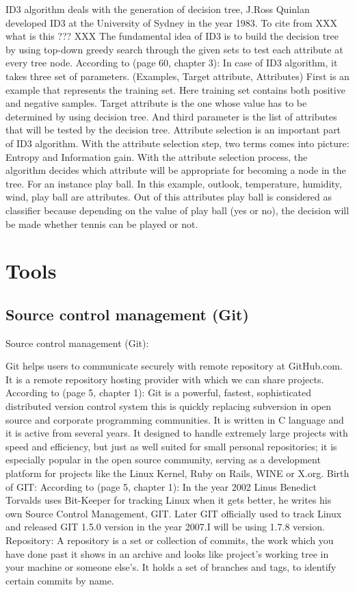 \documentclass{article}
\begin{document}
ID3 algorithm deals with the generation of decision tree, J.Ross Quinlan developed ID3 at the University of Sydney in the year 1983. To cite from \cite{OverviewOfDecisionTrees} XXX what is this ??? XXX
The fundamental idea of ID3 is to build the decision tree by using top-down greedy search through the given sets to test each attribute at every tree node.
According to \cite{Mitchell1997MachineLearning}(page 60, chapter 3): In case of ID3 algorithm, it takes three set of parameters.
(Examples, Target attribute, Attributes)
First is an example that represents the training set. Here training set contains both positive and negative samples. Target attribute is the one whose value has to be determined by using decision tree. And third parameter is the list of attributes that will be tested by the decision tree. Attribute selection is an important part of ID3 algorithm. With the attribute selection step, two terms comes into picture: Entropy and Information gain. With the attribute selection process, the algorithm decides which attribute will be appropriate for becoming a node in the tree.
For an instance play ball. In this example, outlook, temperature, humidity, wind, play ball are attributes. Out of this attributes play ball is considered as classifier because depending on the value of play ball (yes or no), the decision will be made whether tennis can be played or not.


\section{Tools}
\label{sec:Tools}

\subsection{Source control management (Git)}
\label{sec:scm}

Source control management (Git):

Git helps users to communicate securely with remote repository at GitHub.com. It is a remote repository hosting provider with which we can share projects.	
According to \cite{Chacon2011ProGit} (page 5, chapter 1): Git is a powerful, fastest, sophisticated distributed version control system this is quickly replacing subversion in open source and corporate programming communities. It is written in C language and it is active from several years. It designed to handle extremely large projects with speed and efficiency,	but just as well suited for small personal repositories; it is especially popular in the open source community, serving as a development platform for projects like the Linux Kernel, Ruby on Rails, WINE or X.org.
Birth of GIT:
According to \cite{Chacon2011ProGit}(page 5, chapter 1): In the year 2002 Linus Benedict Torvalds uses Bit-Keeper for tracking Linux when it gets better, he writes his own Source Control Management, GIT. Later GIT officially used to track Linux and released GIT 1.5.0 version in the year 2007.I will be using 1.7.8 version.
Repository:  A repository is a set or collection of commits, the work which you have done past it shows in an archive and looks like project's working tree in your machine or someone else's. It holds a set of branches and tags, to identify certain commits by name.
\end{document}
